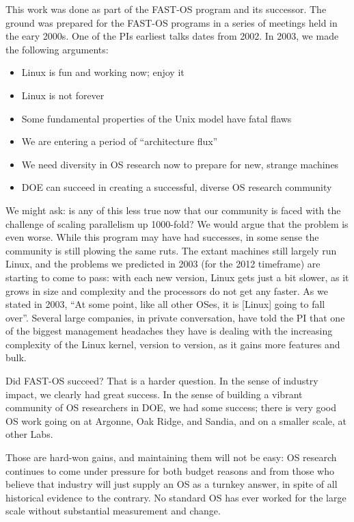 \documentclass{report}
\begin{document}
This work was done as part of the FAST-OS program and its successor. 
The ground was prepared for the FAST-OS programs in a series of meetings held in
the eary 2000s. One of the PIs earliest talks dates from 2002. In 2003, we made
the following arguments: 
\begin{itemize}
\item Linux is fun and working now; enjoy it
\item Linux is not forever
\item Some fundamental properties of the Unix model have fatal flaws
\item We are entering a period of “architecture flux” 
\item We need diversity in OS research now to prepare for new, strange machines
\item DOE can succeed in creating a successful, diverse OS research community
\end{itemize}

We might ask: is any of this less true now that our community is faced with 
the challenge of scaling parallelism up 1000-fold? We would argue that 
the problem is even worse. While this program may have had successes, in some 
sense the community is 
still plowing the same ruts. The extant machines still largely run Linux, and the 
problems we predicted in 2003 (for the 2012 timeframe) are starting to 
come to pass: with each new version, Linux gets just a bit slower, as it grows in size 
and complexity and the processors do not get any faster. As we stated in 2003, 
``At some point, like all other OSes, it is [Linux] going to fall over''. 
Several large companies, in private conversation, have told the PI that one of the
biggest management headaches they have is dealing with the increasing complexity of 
the Linux kernel, version to version, as it gains more features and bulk.  

Did FAST-OS succeed? That is a harder question. In the sense of industry impact, we 
clearly had great success. In the sense of building a vibrant community of OS researchers
in DOE, we had some success; there is very good OS work going on at Argonne, Oak Ridge, 
and Sandia, and on a smaller scale, at other Labs. 

Those are hard-won gains, and maintaining them 
will not be easy: OS research continues to come under 
pressure for both budget reasons and 
from those who believe that industry will just supply an OS as a turnkey 
answer, in spite of all historical evidence to the contrary. No standard OS has ever worked
for the large scale without substantial measurement and change. 
\end{document}
